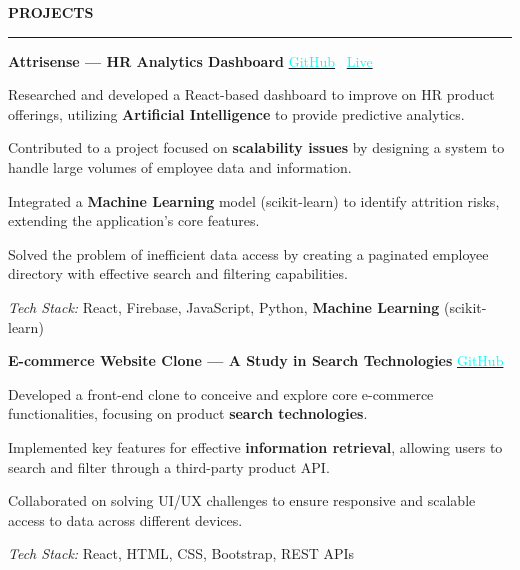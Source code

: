 \documentclass[10pt,a4paper]{article}
\newenvironment{tightitemize}{
  \begin{itemize}[leftmargin=25pt, itemsep=2pt, parsep=2pt, topsep=2pt, partopsep=0pt]
}{
  \end{itemize}
}
\newcommand{\compactspace}{\vspace{6pt}}
\newcommand{\sectiongap}{\vspace{14pt}}
\newcommand{\resumesection}[1]{
    \sectiongap
    {\color{primary} \large \textbf{#1}} \\
    \hrule height 1pt \compactspace
}
\begin{document}
\resumesection{PROJECTS}

\textbf{Attrisense — HR Analytics Dashboard} \hfill 
\href{https://github.com/AbhiAnantapalli215/Attrisense}{\textcolor{cyan}{GitHub}} \textbar\ 
\href{https://attrisense.web.app}{\textcolor{cyan}{Live}}
\begin{tightitemize}
    {\leftskip=12pt
        \item Researched and developed a React-based dashboard to improve on HR product offerings, utilizing \textbf{Artificial Intelligence} to provide predictive analytics.
        \item Contributed to a project focused on \textbf{scalability issues} by designing a system to handle large volumes of employee data and information.
        \item Integrated a \textbf{Machine Learning} model (scikit-learn) to identify attrition risks, extending the application's core features.
        \item Solved the problem of inefficient data access by creating a paginated employee directory with effective search and filtering capabilities.
        \item \textit{Tech Stack:} React, Firebase, JavaScript, Python, \textbf{Machine Learning} (scikit-learn)
    \par}
\end{tightitemize}

\textbf{E-commerce Website Clone — A Study in Search Technologies} \hfill 
\href{https://github.com/AbhiAnantapalli215/amazon-clone}{\textcolor{cyan}{GitHub}}
\begin{tightitemize}
    {\leftskip=12pt
        \item Developed a front-end clone to conceive and explore core e-commerce functionalities, focusing on product \textbf{search technologies}.
        \item Implemented key features for effective \textbf{information retrieval}, allowing users to search and filter through a third-party product API.
        \item Collaborated on solving UI/UX challenges to ensure responsive and scalable access to data across different devices.
        \item \textit{Tech Stack:} React, HTML, CSS, Bootstrap, REST APIs
    \par}
\end{tightitemize}
\end{document}
